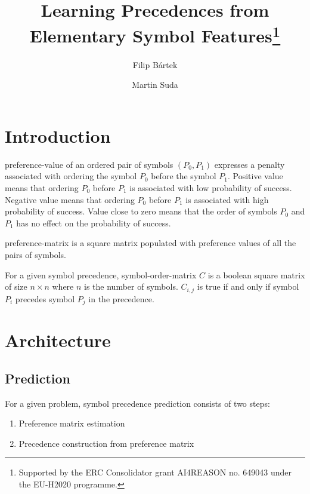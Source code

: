 

\title{Learning Precedences from Elementary Symbol Features\thanks{Supported by the ERC Consolidator grant AI4REASON no. 649043 under the EU-H2020 programme.}}
\author{Filip B\'{a}rtek \and Martin Suda}



\maketitle

\section{Introduction}

\Gls{preference-value} of an ordered pair of symbols \((P_0, P_1)\) expresses a penalty associated with ordering the symbol \(P_0\) before the symbol \(P_1\).
Positive value means that ordering \(P_0\) before \(P_1\) is associated with low probability of success.
Negative value means that ordering \(P_0\) before \(P_1\) is associated with high probability of success.
Value close to zero means that the order of symbols \(P_0\) and \(P_1\) has no effect on the probability of success.

\Gls{preference-matrix} is a square matrix populated with preference values of all the pairs of symbols.

For a given symbol precedence,
\gls{symbol-order-matrix} \(C\) is a boolean square matrix of size \(n \times n\) where \(n\) is the number of symbols.
\(C_{i, j}\) is true if and only if symbol \(P_i\) precedes symbol \(P_j\) in the precedence.

\section{Architecture}

\subsection{Prediction}

For a given problem, symbol precedence prediction consists of two steps:

\begin{enumerate}
	\item Preference matrix estimation
	\item Precedence construction from preference matrix
\end{enumerate}

